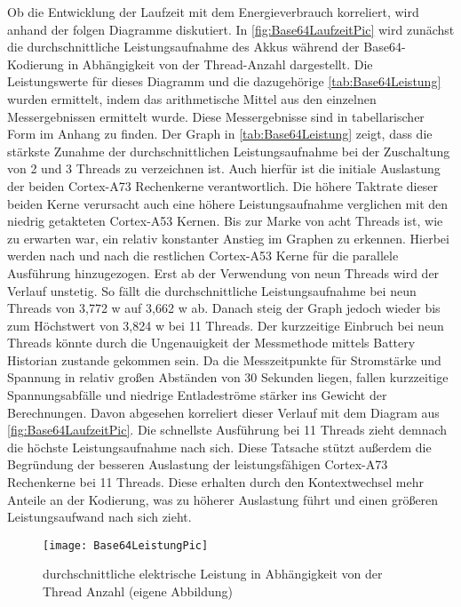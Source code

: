 Ob die Entwicklung der Laufzeit mit dem Energieverbrauch korreliert, wird anhand der folgen Diagramme diskutiert. In \autoref{fig:Base64LaufzeitPic} wird zunächst die durchschnittliche Leistungsaufnahme des Akkus während der Base64-Kodierung in Abhängigkeit von der Thread-Anzahl dargestellt. Die Leistungswerte für dieses Diagramm  und die dazugehörige \autoref{tab:Base64Leistung} wurden ermittelt, indem das arithmetische Mittel aus den einzelnen Messergebnissen ermittelt wurde. Diese Messergebnisse sind in tabellarischer Form im Anhang zu finden. Der Graph in \autoref{tab:Base64Leistung} zeigt, dass die stärkste Zunahme der durchschnittlichen Leistungsaufnahme bei der Zuschaltung von 2 und 3 Threads zu verzeichnen ist. Auch hierfür ist die initiale Auslastung der beiden Cortex-A73 Rechenkerne verantwortlich. Die höhere Taktrate dieser beiden Kerne verursacht auch eine höhere Leistungsaufnahme verglichen mit den niedrig getakteten Cortex-A53 Kernen. Bis zur Marke von acht Threads ist, wie zu erwarten war, ein relativ konstanter Anstieg im Graphen zu erkennen. Hierbei werden nach und nach die restlichen Cortex-A53 Kerne für die parallele Ausführung hinzugezogen. Erst ab der Verwendung von neun Threads wird der Verlauf unstetig. So fällt die durchschnittliche Leistungsaufnahme bei neun Threads von 3,772 \ac{w} auf 3,662 \ac{w} ab. Danach steig der Graph jedoch wieder bis zum Höchstwert von 3,824 \ac{w} bei 11 Threads. Der kurzzeitige Einbruch bei neun Threads könnte durch die  Ungenauigkeit der Messmethode mittels Battery Historian zustande gekommen sein. Da die Messzeitpunkte für Stromstärke und Spannung in relativ großen Abständen von 30 Sekunden liegen, fallen kurzzeitige Spannungsabfälle und niedrige Entladeströme stärker ins Gewicht der Berechnungen. Davon abgesehen korreliert dieser Verlauf mit dem Diagram aus \autoref{fig:Base64LaufzeitPic}. Die schnellste Ausführung bei 11 Threads zieht demnach die höchste Leistungsaufnahme nach sich. Diese Tatsache stützt außerdem die Begründung der besseren Auslastung der leistungsfähigen Cortex-A73 Rechenkerne bei 11 Threads. Diese erhalten durch den Kontextwechsel mehr Anteile an der Kodierung, was zu höherer Auslastung führt und einen größeren Leistungsaufwand nach sich zieht. 


\begin{figure}[h]
	\begin{center}	 
	\texttt{[image: Base64LeistungPic]}
	\caption{durchschnittliche elektrische Leistung in Abhängigkeit von der Thread Anzahl (eigene Abbildung)}
	\label{fig:Base64LeistungPic} 
	\end{center}
\end{figure}

